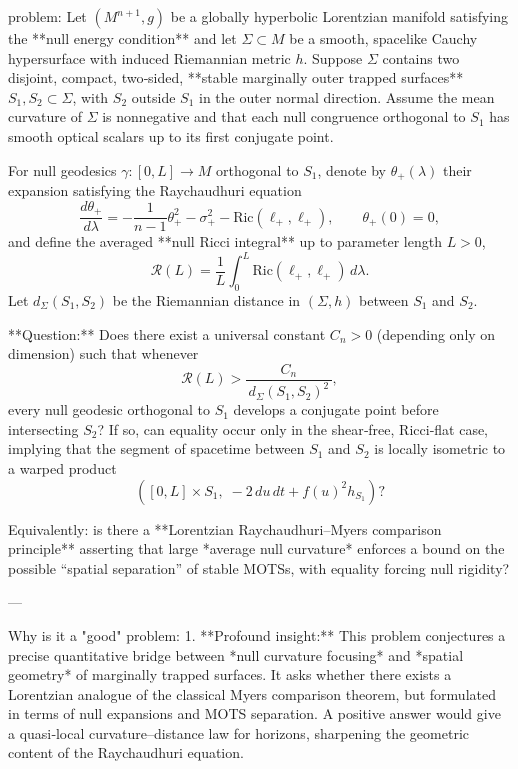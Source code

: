 problem:  
Let \((M^{n+1},g)\) be a globally hyperbolic Lorentzian manifold satisfying the **null energy condition** and let \(\Sigma\subset M\) be a smooth, spacelike Cauchy hypersurface with induced Riemannian metric \(h\).  
Suppose \(\Sigma\) contains two disjoint, compact, two‑sided, **stable marginally outer trapped surfaces** \(S_1,S_2\subset\Sigma\), with \(S_2\) outside \(S_1\) in the outer normal direction.  
Assume the mean curvature of \(\Sigma\) is nonnegative and that each null congruence orthogonal to \(S_1\) has smooth optical scalars up to its first conjugate point.

For null geodesics \(\gamma:[0,L]\to M\) orthogonal to \(S_1\), denote by \(\theta_+(\lambda)\) their expansion satisfying the Raychaudhuri equation  
\[
\frac{d\theta_+}{d\lambda}=-\frac{1}{n-1}\theta_+^2-\sigma_+^2-\mathrm{Ric}(\ell_+,\ell_+),\qquad \theta_+(0)=0,
\]
and define the averaged **null Ricci integral** up to parameter length \(L>0\),
\[
\mathcal{R}(L)=\frac{1}{L}\int_0^L\mathrm{Ric}(\ell_+,\ell_+)\,d\lambda.
\]
Let \(d_\Sigma(S_1,S_2)\) be the Riemannian distance in \((\Sigma,h)\) between \(S_1\) and \(S_2\).

**Question:**  
Does there exist a universal constant \(C_n>0\) (depending only on dimension) such that whenever
\[
\mathcal{R}(L) > \frac{C_n}{\,d_\Sigma(S_1,S_2)^2\,},
\]
every null geodesic orthogonal to \(S_1\) develops a conjugate point before intersecting \(S_2\)?  
If so, can equality occur only in the shear‑free, Ricci‑flat case, implying that the segment of spacetime between \(S_1\) and \(S_2\) is locally isometric to a warped product
\[
([0,L]\times S_1,\; -2\,du\,dt + f(u)^2h_{S_1})?
\]

Equivalently: is there a **Lorentzian Raychaudhuri–Myers comparison principle** asserting that large *average null curvature* enforces a bound on the possible “spatial separation” of stable MOTSs, with equality forcing null rigidity?

---

Why is it a "good" problem:  
1. **Profound insight:**  
This problem conjectures a precise quantitative bridge between *null curvature focusing* and *spatial geometry* of marginally trapped surfaces.  It asks whether there exists a Lorentzian analogue of the classical Myers comparison theorem, but formulated in terms of null expansions and MOTS separation.  A positive answer would give a quasi‑local curvature–distance law for horizons, sharpening the geometric content of the Raychaudhuri equation.

